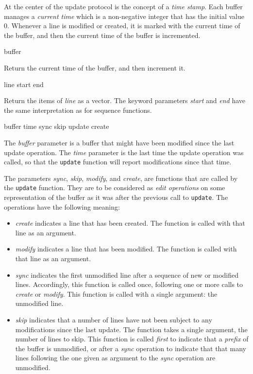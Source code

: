 At the center of the update protocol is the concept of a \emph{time
  stamp}.  Each buffer manages a \emph{current time} which is a
non-negative integer that has the initial value $0$.  Whenever a line
is modified or created, it is marked with the current time of the
buffer, and then the current time of the buffer is incremented.

 {buffer}

Return the current time of the buffer, and then increment it. 

 {line \key start end}

Return the items of \textit{line} as a vector.  The keyword parameters
\textit{start} and \textit{end} have the same interpretation as for
\cl{} sequence functions.

 {buffer time sync skip update create}

The \textit{buffer} parameter is a buffer that might have been
modified since the last update operation.  The \textit{time} parameter
is the last time the update operation was called, so that the
\texttt{update} function will report modifications since that time. 

The parameters \textit{sync}, \textit{skip}, \textit{modify}, and
\textit{create}, are functions that are called by the \texttt{update}
function.  They are to be considered as \emph{edit operations} on some
representation of the buffer as it was after the previous call to
\texttt{update}.  The operations have the following meaning:

\begin{itemize}
\item \textit{create} indicates a line that has been created.  The
  function is called with that line as an argument.
\item \textit{modify}%
  indicates a line that has been modified.  The
  function is called with that line as an argument.
\item \textit{sync} indicates the first unmodified line after a
  sequence of new or modified lines.  Accordingly, this function is
  called once, following one or more calls to \textit{create} or
  \textit{modify}.  This function is called with a single argument:
  the unmodified line.
\item \textit{skip} indicates that a number of lines have not been
  subject to any modifications since the last update.  The function
  takes a single argument, the number of lines to skip.  This function
  is called \emph{first} to indicate that a \emph{prefix} of the
  buffer is unmodified, or after a \emph{sync} operation to indicate
  that that many lines following the one given as argument to the
  \textit{sync} operation are unmodified.%
\end{itemize}


